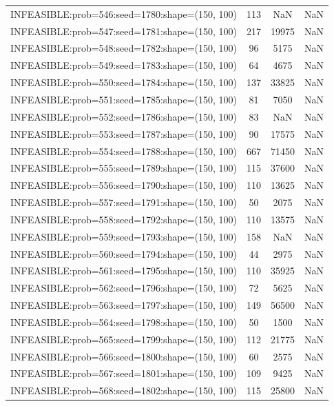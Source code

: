 \begin{longtable}{lccc}
INFEASIBLE:prob=546:seed=1780:shape=(150, 100) &   113 &   NaN &    NaN \\
INFEASIBLE:prob=547:seed=1781:shape=(150, 100) &   217 & 19975 &    NaN \\
INFEASIBLE:prob=548:seed=1782:shape=(150, 100) &    96 &  5175 &    NaN \\
INFEASIBLE:prob=549:seed=1783:shape=(150, 100) &    64 &  4675 &    NaN \\
INFEASIBLE:prob=550:seed=1784:shape=(150, 100) &   137 & 33825 &    NaN \\
INFEASIBLE:prob=551:seed=1785:shape=(150, 100) &    81 &  7050 &    NaN \\
INFEASIBLE:prob=552:seed=1786:shape=(150, 100) &    83 &   NaN &    NaN \\
INFEASIBLE:prob=553:seed=1787:shape=(150, 100) &    90 & 17575 &    NaN \\
INFEASIBLE:prob=554:seed=1788:shape=(150, 100) &   667 & 71450 &    NaN \\
INFEASIBLE:prob=555:seed=1789:shape=(150, 100) &   115 & 37600 &    NaN \\
INFEASIBLE:prob=556:seed=1790:shape=(150, 100) &   110 & 13625 &    NaN \\
INFEASIBLE:prob=557:seed=1791:shape=(150, 100) &    50 &  2075 &    NaN \\
INFEASIBLE:prob=558:seed=1792:shape=(150, 100) &   110 & 13575 &    NaN \\
INFEASIBLE:prob=559:seed=1793:shape=(150, 100) &   158 &   NaN &    NaN \\
INFEASIBLE:prob=560:seed=1794:shape=(150, 100) &    44 &  2975 &    NaN \\
INFEASIBLE:prob=561:seed=1795:shape=(150, 100) &   110 & 35925 &    NaN \\
INFEASIBLE:prob=562:seed=1796:shape=(150, 100) &    72 &  5625 &    NaN \\
INFEASIBLE:prob=563:seed=1797:shape=(150, 100) &   149 & 56500 &    NaN \\
INFEASIBLE:prob=564:seed=1798:shape=(150, 100) &    50 &  1500 &    NaN \\
INFEASIBLE:prob=565:seed=1799:shape=(150, 100) &   112 & 21775 &    NaN \\
INFEASIBLE:prob=566:seed=1800:shape=(150, 100) &    60 &  2575 &    NaN \\
INFEASIBLE:prob=567:seed=1801:shape=(150, 100) &   109 &  9425 &    NaN \\
INFEASIBLE:prob=568:seed=1802:shape=(150, 100) &   115 & 25800 &    NaN \\

\end{longtable}
